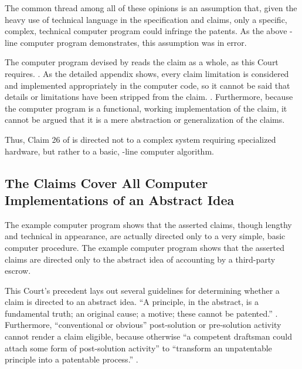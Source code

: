 \documentclass{scotus}
\begin{document}
The common thread among all of these opinions is an assumption that, given the
heavy use of technical language in the specification and claims, only a
specific, complex, technical computer program could infringe the patents. As the
above \numlines-line computer program demonstrates, this assumption was in
error.

The computer program devised by \amici reads
the claim as a whole, as this Court requires. . As
the detailed appendix shows, every
claim limitation is considered and implemented appropriately in the
computer code, so it cannot be said that details or limitations have been
stripped from the claim. . Furthermore,
because
the computer program is a functional, working implementation of the claim, it
cannot be argued that it is a mere abstraction or generalization of the claims.

Thus, Claim 26 of  is directed not to a complex
system requiring specialized hardware, but rather to a basic,
\numlines-line computer algorithm.


%
%
\subsection{The Claims Cover All
Computer Implementations of an Abstract Idea}

The example computer program shows that the asserted claims, though lengthy and
technical in appearance, are actually directed only to a very simple, basic
computer procedure. The example computer program
shows that the asserted claims are directed only to the abstract idea of
accounting by a third-party escrow.

This Court's precedent lays out several guidelines for determining whether a
claim is directed to an abstract idea.
``A principle, in the abstract, is a fundamental truth; an original cause; a
motive; these cannot be patented.''
.
Furthermore, ``conventional or
obvious''
post-solution or pre-solution activity cannot
render a claim eligible, because otherwise
``a competent draftsman could attach some form of post-solution activity'' to
``transform an unpatentable principle into a patentable process.''
.
\end{document}
